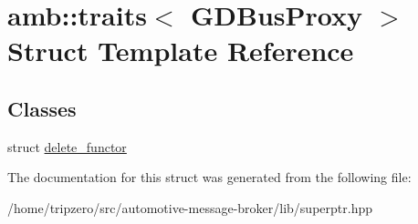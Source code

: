 \hypertarget{structamb_1_1traits_3_01GDBusProxy_01_4}{\section{amb\-:\-:traits$<$ G\-D\-Bus\-Proxy $>$ Struct Template Reference}
\label{structamb_1_1traits_3_01GDBusProxy_01_4}
}
\subsection*{Classes}
\begin{DoxyCompactItemize}
\item 
struct \hyperlink{structamb_1_1traits_3_01GDBusProxy_01_4_1_1delete__functor}{delete\-\_\-functor}
\end{DoxyCompactItemize}


The documentation for this struct was generated from the following file\-:\begin{DoxyCompactItemize}
\item 
/home/tripzero/src/automotive-\/message-\/broker/lib/superptr.\-hpp\end{DoxyCompactItemize}
